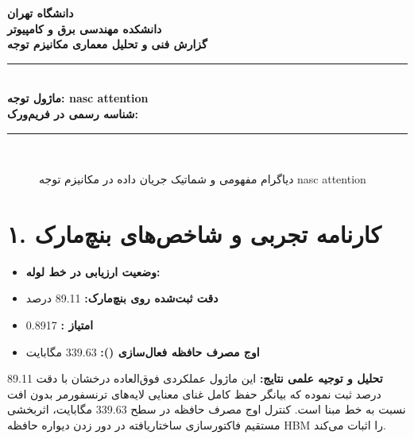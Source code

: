 \documentclass[12pt,a4paper]{article}
\begin{document}
\begin{center}
{\Large\bfseries دانشگاه تهران}\\[0.2cm]
{\large\bfseries دانشکده مهندسی برق و کامپیوتر}\\[0.2cm]
{\large\bfseries گزارش فنی و تحلیل معماری مکانیزم توجه}\\[0.5cm]
\rule{\linewidth}{1pt}\\[0.3cm]
{\LARGE\bfseries ماژول توجه: nasc attention}\\[0.2cm]
{\large \textbf{شناسه رسمی در فریم‌ورک:} }\\[0.2cm]
\rule{\linewidth}{1pt}\\[0.5cm]
\end{center}

\begin{figure}[H]
\centering
{}
\caption{دیاگرام مفهومی و شماتیک جریان داده در مکانیزم توجه nasc attention}
\end{figure}

\section*{۱. کارنامه تجربی و شاخص‌های بنچ‌مارک}
\begin{itemize}
\item \textbf{وضعیت ارزیابی در خط لوله:} 
\item \textbf{دقت ثبت‌شده روی بنچ‌مارک:} 89.11 درصد
\item \textbf{امتیاز :} 0.8917
\item \textbf{اوج مصرف حافظه فعال‌سازی ():} 339.63 مگابایت
\end{itemize}
\textbf{تحلیل و توجیه علمی نتایج:} این ماژول عملکردی فوق‌العاده درخشان با دقت 89.11 درصد ثبت نموده که بیانگر حفظ کامل غنای معنایی لایه‌های ترنسفورمر بدون افت نسبت به خط مبنا است. کنترل اوج مصرف حافظه در سطح 339.63 مگابایت، اثربخشی مستقیم فاکتورسازی ساختاریافته در دور زدن دیواره حافظه HBM را اثبات می‌کند.
\end{document}

